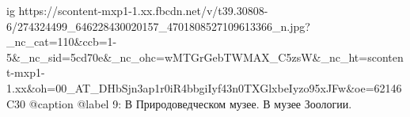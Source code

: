  
 
 
 
 

\ifcmt
  ig https://scontent-mxp1-1.xx.fbcdn.net/v/t39.30808-6/274324499_646228430020157_4701808527109613366_n.jpg?_nc_cat=110&ccb=1-5&_nc_sid=5cd70e&_nc_ohc=wMTGrGebTWMAX_C5zsW&_nc_ht=scontent-mxp1-1.xx&oh=00_AT_DHbSjn3ap1r0iR4bbgiIyf43n0TXGlxbeIyzo95xJFw&oe=62146C30
  @caption @label 9: В Природоведческом музее. В музее Зоологии.
\fi
